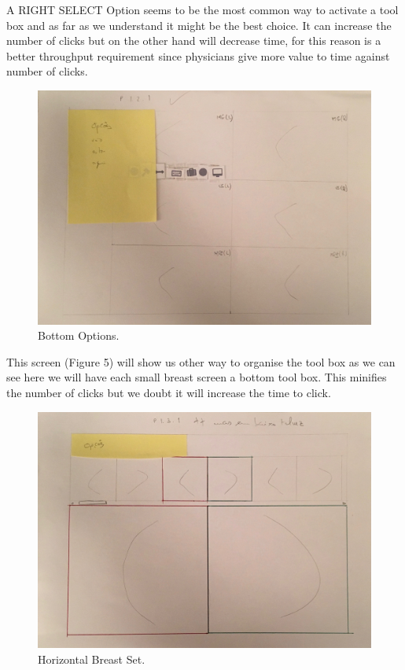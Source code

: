 A RIGHT SELECT Option seems to be the most common way to activate a tool box and as far as we understand it might be the best choice. It can increase the number of clicks but on the other hand will decrease time, for this reason is a better throughput requirement since physicians give more value to time against number of clicks.

\clearpage

\begin{figure}[!hbt]
\centering
\includegraphics[width=1.00\textwidth]{p121.png}
\caption{\label{fig:P 1.2.1}Bottom Options.
}
\end{figure}

This screen (Figure 5) will show us other way to organise the tool box as we can see here we will have each small breast screen a bottom tool box. This minifies the number of clicks but we doubt it will increase the time to click.

\clearpage

\begin{figure}[!hbt]
\centering
\includegraphics[width=1.00\textwidth]{p131.png}
\caption{\label{fig:P 1.3.1}Horizontal Breast Set.
}
\end{figure}

